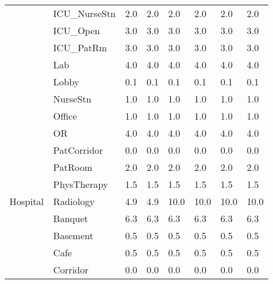 \begin{center}
\begin{longtable}{p{1.25in}p{1in}p{0.5in}p{0.5in}p{0.5in}p{0.5in}p{0.5in}p{0.5in}}
                                   & ICU\_NurseStn                        & 2.0     & 2.0     & 2.0    & 2.0   & 2.0   & 2.0    \\
                                   & ICU\_Open                            & 3.0     & 3.0     & 3.0    & 3.0   & 3.0   & 3.0    \\
                                   & ICU\_PatRm                           & 3.0     & 3.0     & 3.0    & 3.0   & 3.0   & 3.0    \\
                                   & Lab                                  & 4.0     & 4.0     & 4.0    & 4.0   & 4.0   & 4.0    \\
                                   & Lobby                                & 0.1     & 0.1     & 0.1    & 0.1   & 0.1   & 0.1    \\
                                   & NurseStn                             & 1.0     & 1.0     & 1.0    & 1.0   & 1.0   & 1.0    \\
                                   & Office                               & 1.0     & 1.0     & 1.0    & 1.0   & 1.0   & 1.0    \\
                                   & OR                                   & 4.0     & 4.0     & 4.0    & 4.0   & 4.0   & 4.0    \\
                                   & PatCorridor                          & 0.0     & 0.0     & 0.0    & 0.0   & 0.0   & 0.0    \\
                                   & PatRoom                              & 2.0     & 2.0     & 2.0    & 2.0   & 2.0   & 2.0    \\
                                   & PhysTherapy                          & 1.5     & 1.5     & 1.5    & 1.5   & 1.5   & 1.5    \\
Hospital                           & Radiology                            & 4.9     & 4.9     & 10.0   & 10.0  & 10.0  & 10.0   \\
                                   & Banquet                              & 6.3     & 6.3     & 6.3    & 6.3   & 6.3   & 6.3    \\
                                   & Basement                             & 0.5     & 0.5     & 0.5    & 0.5   & 0.5   & 0.5    \\
                                   & Cafe                                 & 0.5     & 0.5     & 0.5    & 0.5   & 0.5   & 0.5    \\
                                   & Corridor                             & 0.0     & 0.0     & 0.0    & 0.0   & 0.0   & 0.0    \\

\end{longtable}
\end{center}
